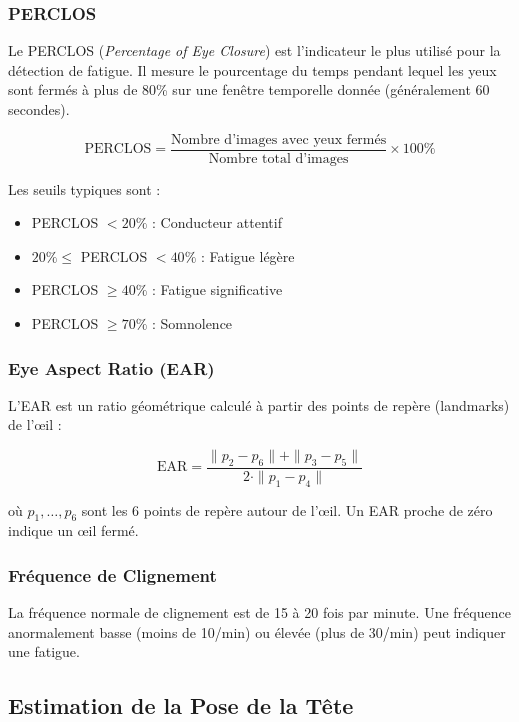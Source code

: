 \documentclass[12pt,a4paper]{report}
\begin{document}
\subsubsection{PERCLOS}

Le PERCLOS (\textit{Percentage of Eye Closure}) est l'indicateur le plus utilisé pour la détection de fatigue. Il mesure le pourcentage du temps pendant lequel les yeux sont fermés à plus de 80\% sur une fenêtre temporelle donnée (généralement 60 secondes).

\begin{equation}
    \text{PERCLOS} = \frac{\text{Nombre d'images avec yeux fermés}}{\text{Nombre total d'images}} \times 100\%
\end{equation}

Les seuils typiques sont :
\begin{itemize}
    \item PERCLOS $< 20\%$ : Conducteur attentif
    \item $20\% \leq$ PERCLOS $< 40\%$ : Fatigue légère
    \item PERCLOS $\geq 40\%$ : Fatigue significative
    \item PERCLOS $\geq 70\%$ : Somnolence
\end{itemize}

\subsubsection{Eye Aspect Ratio (EAR)}

L'EAR est un ratio géométrique calculé à partir des points de repère (landmarks) de l'œil :

\begin{equation}
    \text{EAR} = \frac{\|p_2 - p_6\| + \|p_3 - p_5\|}{2 \cdot \|p_1 - p_4\|}
\end{equation}

où $p_1, \ldots, p_6$ sont les 6 points de repère autour de l'œil. Un EAR proche de zéro indique un œil fermé.

\subsubsection{Fréquence de Clignement}

La fréquence normale de clignement est de 15 à 20 fois par minute. Une fréquence anormalement basse (moins de 10/min) ou élevée (plus de 30/min) peut indiquer une fatigue.

\subsection{Estimation de la Pose de la Tête}
\end{document}
